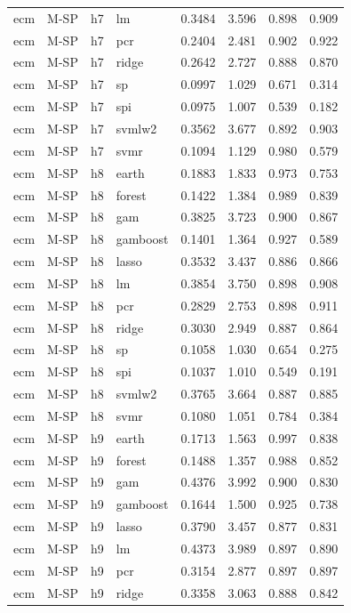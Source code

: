 \begin{ThreePartTable}
\begin{longtable}[t]{llclcccc}
ecm & M-SP & h7 & lm & 0.3484 & 3.596 & 0.898 & 0.909\\
ecm & M-SP & h7 & pcr & 0.2404 & 2.481 & 0.902 & 0.922\\
ecm & M-SP & h7 & ridge & 0.2642 & 2.727 & 0.888 & 0.870\\
ecm & M-SP & h7 & sp & 0.0997 & 1.029 & 0.671 & 0.314\\
ecm & M-SP & h7 & spi & 0.0975 & 1.007 & 0.539 & 0.182\\
ecm & M-SP & h7 & svmlw2 & 0.3562 & 3.677 & 0.892 & 0.903\\
ecm & M-SP & h7 & svmr & 0.1094 & 1.129 & 0.980 & 0.579\\
\addlinespace
ecm & M-SP & h8 & earth & 0.1883 & 1.833 & 0.973 & 0.753\\
ecm & M-SP & h8 & forest & 0.1422 & 1.384 & 0.989 & 0.839\\
ecm & M-SP & h8 & gam & 0.3825 & 3.723 & 0.900 & 0.867\\
ecm & M-SP & h8 & gamboost & 0.1401 & 1.364 & 0.927 & 0.589\\
ecm & M-SP & h8 & lasso & 0.3532 & 3.437 & 0.886 & 0.866\\
ecm & M-SP & h8 & lm & 0.3854 & 3.750 & 0.898 & 0.908\\
ecm & M-SP & h8 & pcr & 0.2829 & 2.753 & 0.898 & 0.911\\
ecm & M-SP & h8 & ridge & 0.3030 & 2.949 & 0.887 & 0.864\\
ecm & M-SP & h8 & sp & 0.1058 & 1.030 & 0.654 & 0.275\\
ecm & M-SP & h8 & spi & 0.1037 & 1.010 & 0.549 & 0.191\\
ecm & M-SP & h8 & svmlw2 & 0.3765 & 3.664 & 0.887 & 0.885\\
ecm & M-SP & h8 & svmr & 0.1080 & 1.051 & 0.784 & 0.384\\
\addlinespace
ecm & M-SP & h9 & earth & 0.1713 & 1.563 & 0.997 & 0.838\\
ecm & M-SP & h9 & forest & 0.1488 & 1.357 & 0.988 & 0.852\\
ecm & M-SP & h9 & gam & 0.4376 & 3.992 & 0.900 & 0.830\\
ecm & M-SP & h9 & gamboost & 0.1644 & 1.500 & 0.925 & 0.738\\
ecm & M-SP & h9 & lasso & 0.3790 & 3.457 & 0.877 & 0.831\\
ecm & M-SP & h9 & lm & 0.4373 & 3.989 & 0.897 & 0.890\\
ecm & M-SP & h9 & pcr & 0.3154 & 2.877 & 0.897 & 0.897\\
ecm & M-SP & h9 & ridge & 0.3358 & 3.063 & 0.888 & 0.842\\

\end{longtable}
\end{ThreePartTable}

